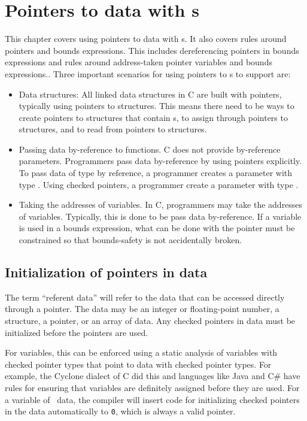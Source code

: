 
\chapter{Pointers  to data with \arrayptr s}
\label{chapter:pointers-to-data-with-arrayptrs}

This chapter covers using pointers to data with \arrayptr s.  It also covers rules
around pointers and bounds expressions.  This includes dereferencing pointers
in bounds expressions and rules around address-taken pointer variables and
bounds expressions..
Three important scenarios for using pointers to \arrayptr s to support are:
\begin{itemize}
\item Data structures: All linked data structures in 
C are built with pointers, typically using pointers to structures.   This means
there need to be ways to create pointers to structures that contain \arrayptr s,
to assign through pointers to structures, and to read from pointers to structures.
\item Passing data by-reference to functions.  C does not provide by-reference
parameters.  Programmers pass data by-reference by using pointers explicitly.
To pass data of type  by reference, a programmer creates a parameter
with type .  Using checked pointers, a programmer create a parameter
with type \ptrT.
\item Taking the addresses of variables.  In C, programmers may take the
addresses of variables.  Typically, this is done to be pass data by-reference.
If a variable is used in a bounds expression, what can be done with the pointer
must be constrained so that bounds-safety is not accidentally broken.
\end{itemize}

\section{Initialization of pointers in data}

The term ``referent data'' will refer to the data that can be accessed
directly through a pointer.  The data may be an integer or floating-point number, a structure,
a pointer, or an array of data.   Any checked pointers in data must be initialized
before the pointers are used.

For variables, this can be enforced using a static 
analysis of variables with checked pointer types that point to data with checked
pointer types. For example, the Cyclone dialect of C \cite{Jim2002} did this
and languages like Java and C\# have rules for ensuring that variables
are definitely assigned before they are used.
For a variable of \arrayptr\ data, the compiler will insert code for 
initializing checked pointers in the data automatically to \texttt{0}, which is always
a valid pointer.    

